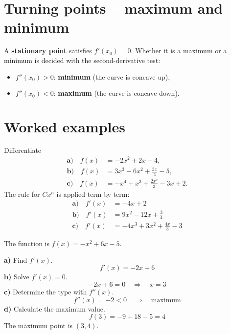 \section{Turning points -- maximum and minimum}
\label{c12:sec:extrempunkter}
A \textbf{stationary point} satisfies $f'(x_0) = 0$. Whether it is a maximum or a minimum is
decided with the second-derivative test:
\begin{itemize}
  \item $f''(x_0) > 0$: \textbf{minimum} (the curve is concave up),
  \item $f''(x_0) < 0$: \textbf{maximum} (the curve is concave down).
\end{itemize}

\section{Worked examples}
\label{c12:sec:typexempel}

\begin{exempel}
Differentiate
\begin{align*}
  \textbf{a)}\quad f(x) &= -2x^2 + 2x + 4, \\
  \textbf{b)}\quad f(x) &= 3x^3 - 6x^2 + \frac{3x}{4} - 5, \\
  \textbf{c)}\quad f(x) &= -x^4 + x^3 + \frac{2x^2}{3} - 3x + 2.
\end{align*}
The rule for $Cx^n$ is applied term by term:
\begin{align*}
  \textbf{a)}\quad f'(x) &= -4x + 2 \\
  \textbf{b)}\quad f'(x) &= 9x^2 - 12x + \frac{3}{4} \\
  \textbf{c)}\quad f'(x) &= -4x^3 + 3x^2 + \frac{4x}{3} - 3
\end{align*}
\end{exempel}

\begin{exempel}
The function is $f(x) = -x^2 + 6x - 5$.
\par\noindent\textbf{a)} Find $f'(x)$.
\[
  f'(x) = -2x + 6
\]
\textbf{b)} Solve $f'(x) = 0$.
\[
  -2x + 6 = 0 \quad \Rightarrow \quad x = 3
\]
\textbf{c)} Determine the type with $f''(x)$.
\[
  f''(x) = -2 < 0 \quad \Rightarrow \quad \text{maximum}
\]
\textbf{d)} Calculate the maximum value.
\[
  f(3) = -9 + 18 - 5 = 4
\]
The maximum point is $(3, 4)$.
\end{exempel}

